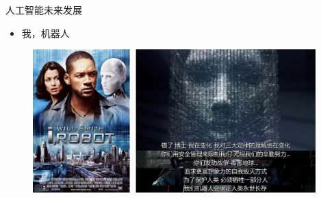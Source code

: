 \documentclass{beamer}
\begin{document}
   \begin{frame}{人工智能未来发展}
    \begin{itemize}
     \item 我，机器人
    \end{itemize}
   \begin{figure}[H]
   \centering
   \includegraphics[width=4.3in]{cdjPic3.jpg}
   \end{figure}
  \end{frame}
\end{document}
